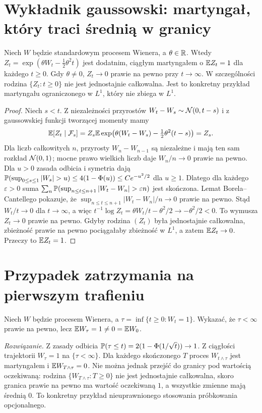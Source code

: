 \section{Wykładnik gaussowski: martyngał, który traci średnią w granicy}
\begin{twierdzenie}
Niech $W$ będzie standardowym procesem Wienera, a
$\theta\in\mathbb{R}$. Wtedy
$Z_t=\exp(\theta W_t-\tfrac12\theta^2t)$
jest dodatnim, ciągłym martyngałem o $\mathbb{E} Z_t=1$
dla każdego $t\ge0$. Gdy $\theta\ne0$,
$Z_t\to0$ prawie na pewno przy $t\to\infty$.
W szczególności rodzina $\{Z_t:t\ge0\}$ nie jest
jednostajnie całkowalna. Jest to konkretny przykład
martyngału ograniczonego w $L^1$, który nie zbiega w $L^1$.
\end{twierdzenie}
\begin{proof}
Niech $s<t$. Z niezależności przyrostów
$W_t-W_s\sim\mathcal{N}(0,t-s)$ i z gaussowskiej
funkcji tworzącej momenty mamy
\[
\mathbb{E}[Z_t\mid\mathcal{F}_s]
=Z_s\mathbb{E}\exp\bigl(\theta(W_t-W_s)-\tfrac12\theta^2(t-s)\bigr)
=Z_s.
\]
Dla liczb całkowitych $n$, przyrosty
$W_n-W_{n-1}$ są niezależne i mają ten sam rozkład
$\mathcal{N}(0,1)$; mocne prawo wielkich liczb daje
$W_n/n\to0$ prawie na pewno.
Dla $u>0$ zasada odbicia i symetria dają
$\Prob(\sup_{0\le s\le1}|W_s|>u)\le
4(1-\Phi(u))\le C e^{-u^2/2}$ dla $u\ge1$.
Dlatego dla każdego $\varepsilon>0$ suma
$\sum_n\Prob(\sup_{n\le t\le n+1}|W_t-W_n|>\varepsilon n)$
jest skończona. Lemat Borela--Cantellego pokazuje, że
$\sup_{n\le t\le n+1}|W_t-W_n|/n\to0$ prawie na pewno.
Stąd $W_t/t\to0$ dla $t\to\infty$, a więc
$t^{-1}\log Z_t=\theta W_t/t-\theta^2/2\to-\theta^2/2<0$.
To wymusza $Z_t\to0$ prawie na pewno.
Gdyby rodzina $(Z_t)$ była jednostajnie całkowalna,
zbieżność prawie na pewno pociągałaby zbieżność w $L^1$,
a zatem $\mathbb{E} Z_t\to0$. Przeczy to $\mathbb{E} Z_t=1$.
\end{proof}

\section{Przypadek zatrzymania na pierwszym trafieniu}
\begin{zadanie}
Niech $W$ będzie procesem Wienera, a
$\tau=\inf\{t\ge0:W_t=1\}$. Wykazać, że
$\tau<\infty$ prawie na pewno, lecz
$\mathbb{E} W_\tau=1\ne0=\mathbb{E} W_0$.

\emph{Rozwiązanie.} Z zasady odbicia
$\mathbb{P}(\tau\le t)=2(1-\Phi(1/\sqrt t))\to1$.
Z ciągłości trajektorii $W_\tau=1$ na $\{\tau<\infty\}$.
Dla każdego skończonego $T$ proces $W_{t\wedge\tau}$
jest martyngałem i $\mathbb{E} W_{T\wedge\tau}=0$.
Nie można jednak przejść do granicy pod wartością oczekiwaną:
rodzina $\{W_{T\wedge\tau}:T\ge0\}$ nie jest
jednostajnie całkowalna, skoro granica prawie na pewno
ma wartość oczekiwaną $1$, a wszystkie zmienne mają
średnią $0$. To konkretny przykład nieuprawnionego
stosowania próbkowania opcjonalnego.
\end{zadanie}


